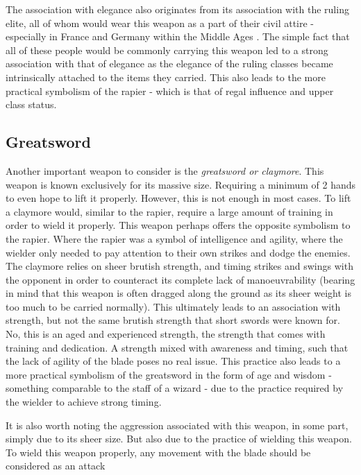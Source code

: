 \documentclass{article}
\begin{document}
The association with elegance also originates from its association with the ruling elite, all of whom would wear this weapon as a part of their civil attire - especially in France and Germany within the Middle Ages \parencite{correa2013history}. The simple fact that all of these people would be commonly carrying this weapon led to a strong association with that of elegance as the elegance of the ruling classes became intrinsically attached to the items they carried. This also leads to the more practical symbolism of the rapier - which is that of regal influence and upper class status.

\subsection{Greatsword} \label{greatswordSymbol}
Another important weapon to consider is the \emph{greatsword or claymore}. This weapon is known exclusively for its massive size. Requiring a minimum of 2 hands to even hope to lift it properly. However, this is not enough in most cases. To lift a claymore would, similar to the rapier, require a large amount of training in order to wield it properly. This weapon perhaps offers the opposite symbolism to the rapier. Where the rapier was a symbol of intelligence and agility, where the wielder only needed to pay attention to their own strikes and dodge the enemies. The claymore relies on sheer brutish strength, and timing strikes and swings with the opponent in order to counteract its complete lack of manoeuvrability (bearing in mind that this weapon is often dragged along the ground as its sheer weight is too much to be carried normally). This ultimately leads to an association with strength, but not the same brutish strength that short swords were known for. No, this is an aged and experienced strength, the strength that comes with training and dedication. A strength mixed with awareness and timing, such that the lack of agility of the blade poses no real issue. This practice also leads to a more practical symbolism of the greatsword in the form of age and wisdom - something comparable to the staff of a wizard - due to the practice required by the wielder to achieve strong timing.

It is also worth noting the aggression associated with this weapon, in some part, simply due to its sheer size. But also due to the practice of wielding this weapon. To wield this weapon properly, any movement with the blade should be considered as an attack
\end{document}
